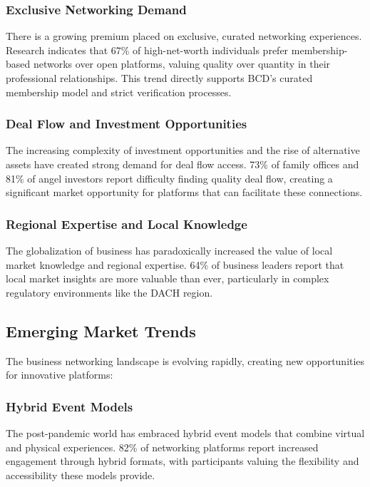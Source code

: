 \subsubsection{Exclusive Networking Demand}
There is a growing premium placed on exclusive, curated networking experiences. Research indicates that 67\% of high-net-worth individuals prefer membership-based networks over open platforms, valuing quality over quantity in their professional relationships. This trend directly supports BCD's curated membership model and strict verification processes.

\subsubsection{Deal Flow and Investment Opportunities}
The increasing complexity of investment opportunities and the rise of alternative assets have created strong demand for deal flow access. 73\% of family offices and 81\% of angel investors report difficulty finding quality deal flow, creating a significant market opportunity for platforms that can facilitate these connections.

\subsubsection{Regional Expertise and Local Knowledge}
The globalization of business has paradoxically increased the value of local market knowledge and regional expertise. 64\% of business leaders report that local market insights are more valuable than ever, particularly in complex regulatory environments like the DACH region.

\subsection{Emerging Market Trends}

The business networking landscape is evolving rapidly, creating new opportunities for innovative platforms:

\subsubsection{Hybrid Event Models}
The post-pandemic world has embraced hybrid event models that combine virtual and physical experiences. 82\% of networking platforms report increased engagement through hybrid formats, with participants valuing the flexibility and accessibility these models provide.

